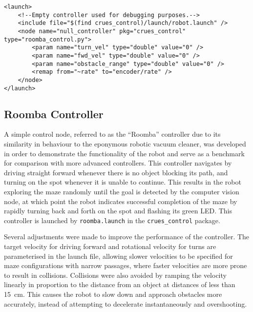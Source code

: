 \begin{lstlisting}[caption={Launch file for null controller}, label={lst:control_launch_example}, style=xml]
<launch>
    <!--Empty controller used for debugging purposes.-->
    <include file="$(find crues_control)/launch/robot.launch" />
    <node name="null_controller" pkg="crues_control" type="roomba_control.py">
        <param name="turn_vel" type="double" value="0" />
        <param name="fwd_vel" type="double" value="0" />
        <param name="obstacle_range" type="double" value="0" />
        <remap from="~rate" to="encoder/rate" />
    </node>
</launch>
\end{lstlisting}


\subsection{Roomba Controller}\label{soft/control/roomba}

A simple control node, referred to as the ``Roomba'' controller due to its
similarity in behaviour to the eponymous robotic vacuum cleaner, was developed
in order to demonstrate the functionality of the robot and serve as a
benchmark for comparison with more advanced controllers. This controller
navigates by driving straight forward whenever there is no object blocking
its path, and turning on the spot whenever it is unable to continue. This
results in the robot exploring the maze randomly until the goal is detected by
the computer vision node, at which point the robot indicates successful
completion of the maze by rapidly turning back and forth on the spot and
flashing its green LED. This controller is launched by \verb|roomba.launch|
in the \verb|crues_control| package.

Several adjustments were made to improve the performance of the controller.
The target velocity for driving forward and rotational velocity for turns are
parameterised in the launch file, allowing slower velocities to be specified
for maze configurations with narrow passages, where faster velocities are
more prone to result in collisions. Collisions were also avoided by ramping
the velocity linearly in proportion to the distance from an object at distances
of less than \SI{15}{\cm}. This causes the robot to slow down and approach
obstacles more accurately, instead of attempting to decelerate instantaneously
and overshooting.

